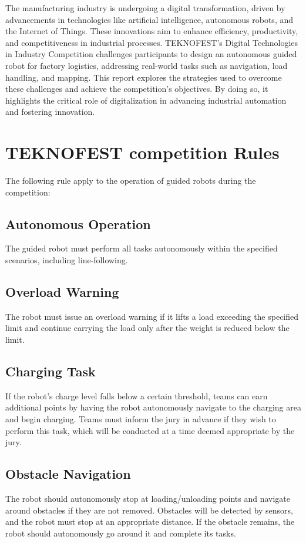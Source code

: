 \documentclass[../../main]{subfiles}
\begin{document}
The manufacturing industry is undergoing a digital transformation, driven by advancements in technologies like artificial intelligence, autonomous robots, and the Internet of Things. These innovations aim to enhance efficiency, productivity, and competitiveness in industrial processes. TEKNOFEST’s Digital Technologies in Industry Competition challenges participants to design an autonomous guided robot for factory logistics, addressing real-world tasks such as navigation, load handling, and mapping. This report explores the strategies used to overcome these challenges and achieve the competition’s objectives. By doing so, it highlights the critical role of digitalization in advancing industrial automation and fostering innovation.

\section{TEKNOFEST competition Rules}
The following rule apply to the operation of guided robots during the competition:

\subsection{Autonomous Operation}
The guided robot must perform all tasks autonomously within the specified scenarios, including line-following.

\subsection{Overload Warning}
The robot must issue an overload warning if it lifts a load exceeding the specified limit and continue carrying the load only after the weight is reduced below the limit.
\newpage
\subsection{Charging Task}
If the robot's charge level falls below a certain threshold, teams can earn additional points by having the robot autonomously navigate to the charging area and begin charging. Teams must inform the jury in advance if they wish to perform this task, which will be conducted at a time deemed appropriate by the jury.

\subsection{Obstacle Navigation}
The robot should autonomously stop at loading/unloading points and navigate around obstacles if they are not removed. Obstacles will be detected by sensors, and the robot must stop at an appropriate distance. If the obstacle remains, the robot should autonomously go around it and complete its tasks.
\end{document}
